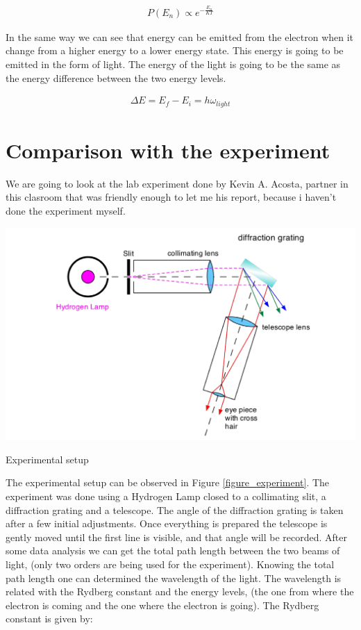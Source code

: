 \begin{equation}
  \begin{array}{c}
    P(E_n) \propto e^{-\frac{E_n}{KT}}
  \end{array}
\end{equation}

In the same way we can see that energy can be emitted from the electron when it change from a higher energy to a lower energy state. This energy is going to be emitted in the form of light. The energy of the light is going to be the same as the energy difference between the two energy levels.

\begin{equation}
  \begin{array}{c}
    \Delta E = E_f - E_i = h\omega_{light}
  \end{array}
\end{equation}

\section{Comparison with the experiment}

We are going to look at the lab experiment done by Kevin A. Acosta, partner in this clasroom that was friendly enough to let me his report, because i haven't done the experiment myself.


\begin{marginfigure}
  \centering
  \includegraphics{images9/experiment.jpeg}
  \caption{Experimental setup}
  \label{figure_experiment}
\end{marginfigure}


The experimental setup can be observed in Figure \ref{figure_experiment}. The experiment was done using a Hydrogen Lamp closed to a collimating slit, a diffraction grating and a telescope. The angle of the diffraction grating is taken after a few initial adjustments. Once everything is prepared the telescope is gently moved until the first line is visible, and that angle will be recorded. After some data analysis we can get the total path length between the two beams of light, (only two orders are being used for the experiment). Knowing the total path length one can determined the wavelength of the light. The wavelength is related with the Rydberg constant and the energy levels, (the one from where the electron is coming and the one where the electron is going). The Rydberg constant is given by:

